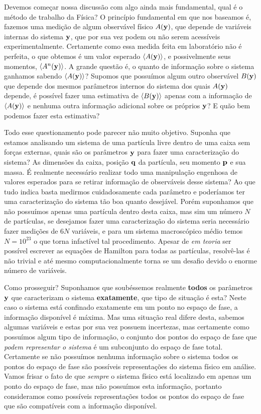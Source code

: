 \documentclass[twoside]{amsart}
\numberwithin{equation}{section}
\begin{document}
Devemos começar nossa discussão com algo ainda mais fundamental, qual é o método de trabalho da Física? O princípio fundamental em que nos baseamos é, fazemos uma medição de algum observável físico $A\qty(\vb y)$, que depende de variáveis internas do sistema $\vb y$, que por sua vez podem ou não serem acessíveis experimentalmente. Certamente como essa medida feita em laboratório não é perfeita, o que obtemos é um valor esperado $\expval{A\qty(\vb y)}$, e possivelmente seus momentos, $\expval{A^n\qty(\vb y)}$. A grande questão é, o quanto de informação sobre o sistema ganhamos sabendo $\expval{A\qty(\vb y)}$? Supomos que possuímos algum outro observável $B\qty(\vb y)$ que depende dos mesmos parâmetros internos do sistema dos quais $A\qty(\vb y)$ depende, é possível fazer uma estimativa de $\expval{B\qty(\vb y)}$ apenas com a informação de $\expval{A\qty(\vb y)}$ e nenhuma outra informação adicional sobre os próprios $\vb y$? E quão bem podemos fazer esta estimativa?

Todo esse questionamento pode parecer não muito objetivo. Suponha que estamos analisando um sistema de uma partícula livre dentro de uma caixa sem forças externas, quais são os parâmetros $\vb y$ para fazer uma caracterização do sistema? As dimensões da caixa, posição $\vb q$ da partícula, seu momento $\vb p$ e sua massa. É realmente necessário realizar todo uma manipulação engenhosa de valores esperados para se retirar informação de observáveis desse sistema? Ao que tudo indica basta medirmos cuidadosamente cada parâmetro e poderíamos ter uma caracterização do sistema tão boa quanto desejável. Porém suponhamos que não possuímos apenas uma partícula dentro desta caixa, mas sim um número $N$ de partículas, se desejamos fazer uma caracterização do sistema seria necessário fazer medições de $6N$ variáveis, e para um sistema macroscópico médio temos $N=10^{23}$ o que torna infactível tal procedimento. Apesar de \emph{em teoria} 
ser possível escrever as equações de Hamilton para todas as partículas, resolvê-las é não trivial e até mesmo computacionalmente torna se um desafio devido o enorme número de variáveis.

Como prosseguir? Suponhamos que soubéssemos realmente \textbf{todos} os parâmetros $\vb y$ que caracterizam o sistema \textbf{exatamente}, que tipo de situação é esta? Neste caso o sistema está confinado exatamente em um ponto no espaço de fase, a informação disponível é máxima. Mas uma situação real difere desta, sabemos algumas variáveis e estas por sua vez possuem incertezas, mas certamente como possuímos algum tipo de informação, o conjunto dos pontos do espaço de fase que \emph{podem representar o sistema} é um subconjunto do espaço de fase total. Certamente se não possuímos nenhuma informação sobre o sistema todos os pontos do espaço de fase são possíveis representações do sistema físico em análise. Vamos frisar o fato de que \emph{sempre} o sistema físico está localizado em apenas um ponto do espaço de fase, mas não possuímos esta informação, portanto consideramos como possíveis representações todos os pontos do espaço de fase que são compatíveis com a informação disponível.
\end{document}
